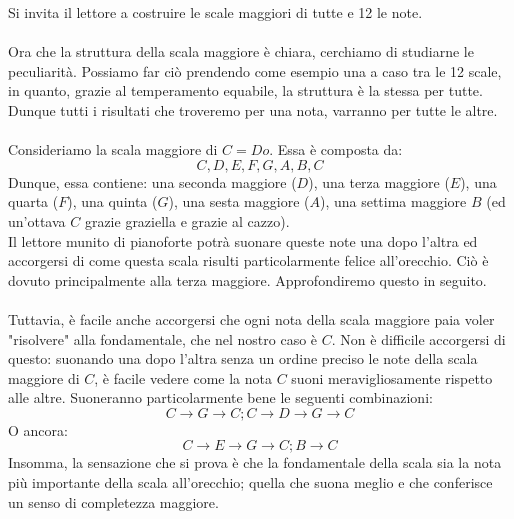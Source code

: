 \documentclass[12pt,a4paper]{report}
\theoremstyle{definition}
\theoremstyle{Theorem}
\theoremstyle{definition}
\theoremstyle{definition}
\theoremstyle{definition}
\begin{document}
	 		 Si invita il lettore a costruire le scale maggiori di tutte e 12 le note.\\
	 		 \\
	 		 Ora che la struttura della scala maggiore è chiara, cerchiamo di studiarne le peculiarità. Possiamo far ciò prendendo come esempio una a caso tra le 12 scale, in quanto, grazie al temperamento equabile, la struttura è la stessa per tutte. Dunque tutti i risultati che troveremo per una nota, varranno per tutte le altre.\\
	 		 \\
	 		 Consideriamo la scala maggiore di $C=Do$. Essa è composta da:
	 		 $$C,D,E,F,G,A,B,C$$
	 		 Dunque, essa contiene: una seconda maggiore ($D$), una terza maggiore ($E$), una quarta ($F$), una quinta ($G$), una sesta maggiore ($A$), una settima maggiore $B$ (ed un'ottava $C$ grazie graziella e grazie al cazzo).\\
	 		 Il lettore munito di pianoforte potrà suonare queste note una dopo l'altra ed accorgersi di come questa scala risulti particolarmente felice all'orecchio. Ciò è dovuto principalmente alla terza maggiore. Approfondiremo questo in seguito.\\
	 		 \\
	 		 Tuttavia, è facile anche accorgersi che ogni nota della scala maggiore paia voler "risolvere" alla fondamentale, che nel nostro caso è $C$. Non è difficile accorgersi di questo: suonando una dopo l'altra senza un ordine preciso le note della scala maggiore di $C$, è facile vedere come la nota $C$ suoni meravigliosamente rispetto alle altre. Suoneranno particolarmente bene le seguenti combinazioni:
	 		 $$C\rightarrow G\rightarrow C;C\rightarrow D\rightarrow G\rightarrow C$$
	 		 O ancora:
	 		 $$C\rightarrow E\rightarrow G\rightarrow C;B\rightarrow C$$
	 		 Insomma, la sensazione che si prova è che la fondamentale della scala sia la nota più importante della scala all'orecchio; quella che suona meglio e che conferisce un senso di completezza maggiore.
\end{document}
